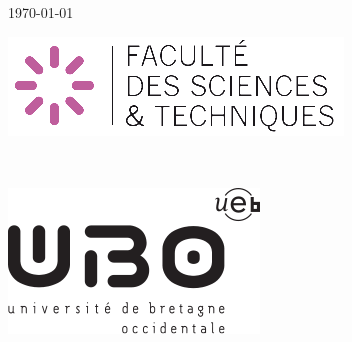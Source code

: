 \documentclass[a4paper,12pt]{report}
\begin{document}
\begin{titlepage}
    
    {\today}\\[1.5cm] %
    
    
		\begin{minipage}{0.48\textwidth}
			\begin{flushleft} \large
				\includegraphics[scale=0.8]{ubo_sc.png} %
			\end{flushleft}
    \end{minipage}
		~
    \begin{minipage}{0.48\textwidth}
			\begin{flushright} \large
				\includegraphics[scale=0.5]{ubo.png} %
			\end{flushright}
    \end{minipage}
    
    
    \vfill %
    
    \end{titlepage}
		
	\pagestyle{fancy}
		\chead{}
		\lfoot{}
		\cfoot{\thepage}
		\rfoot{}
		
\end{document}
